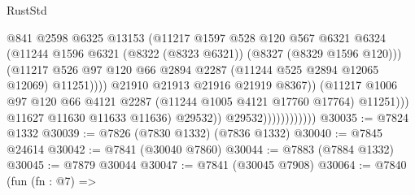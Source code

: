 \begin{lexlean}{RustStd}
\begin{coremodule}
                                              @841
                                              @2598
                                              @6325
                                              @13153
                                              (@11217
                                                @1597
                                                @528
                                                @120
                                                @567
                                                @6321
                                                @6324
                                                (@11244
                                                  @1596
                                                  @6321
                                                  (@8322 (@8323 @6321))
                                                  (@8327 (@8329 @1596 @120)))
                                                (@11217
                                                  @526
                                                  @97
                                                  @120
                                                  @66
                                                  @2894
                                                  @2287
                                                  (@11244 @525 @2894 @12065 @12069)
                                                  @11251))))
                                          @21910
                                          @21913
                                          @21916
                                          @21919
                                          @8367))
                                      (@11217
                                        @1006
                                        @97
                                        @120
                                        @66
                                        @4121
                                        @2287
                                        (@11244 @1005 @4121 @17760 @17764)
                                        @11251)))
                                  @11627
                                  @11630
                                  @11633
                                  @11636)
                                @29532))
                            @29532))))))))))))
@30035 := @7824 @1332
@30039 := @7826 (@7830 @1332) (@7836 @1332)
@30040 := @7845 @24614
@30042 := @7841 (@30040 @7860)
@30044 := @7883 (@7884 @1332)
@30045 := @7879 @30044
@30047 := @7841 (@30045 @7908)
@30064 := @7840
    (fun (fn : @7) =>

\end{coremodule}
\end{lexlean}
